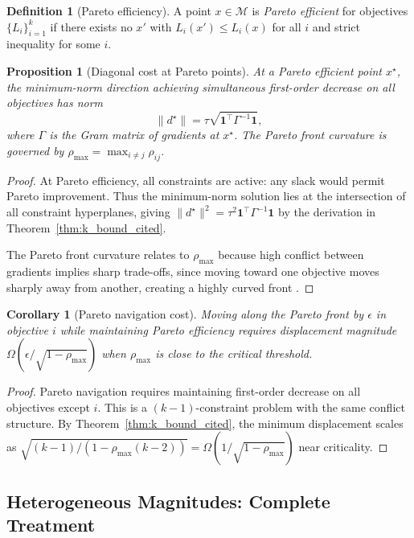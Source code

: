 \documentclass{article}
\theoremstyle{plain}
\newtheorem{proposition}[theorem]{Proposition}
\newtheorem{corollary}[theorem]{Corollary}
\theoremstyle{definition}
\newtheorem{definition}[theorem]{Definition}
\theoremstyle{remark}
\begin{document}
\begin{definition}[Pareto efficiency]
A point $x \in \mathcal{M}$ is \emph{Pareto efficient} for objectives $\{L_i\}_{i=1}^k$ if there exists no $x'$ with $L_i(x') \le L_i(x)$ for all $i$ and strict inequality for some $i$.
\end{definition}

\begin{proposition}[Diagonal cost at Pareto points]
At a Pareto efficient point $x^\star$, the minimum-norm direction achieving simultaneous first-order decrease on all objectives has norm
\[
\|d^\star\| = \tau \sqrt{\mathbf{1}^\top \Gamma^{-1} \mathbf{1}},
\]
where $\Gamma$ is the Gram matrix of gradients at $x^\star$. The Pareto front curvature is governed by $\rho_{\max} = \max_{i \neq j} \rho_{ij}$.
\end{proposition}

\begin{proof}
At Pareto efficiency, all constraints are active: any slack would permit Pareto improvement. Thus the minimum-norm solution lies at the intersection of all constraint hyperplanes, giving $\|d^\star\|^2 = \tau^2 \mathbf{1}^\top \Gamma^{-1} \mathbf{1}$ by the derivation in Theorem~\ref{thm:k_bound_cited}.

The Pareto front curvature relates to $\rho_{\max}$ because high conflict between gradients implies sharp trade-offs, since moving toward one objective moves sharply away from another, creating a highly curved front \citep{deb2002fast}.
\end{proof}

\begin{corollary}[Pareto navigation cost]
Moving along the Pareto front by $\epsilon$ in objective $i$ while maintaining Pareto efficiency requires displacement magnitude $\Omega(\epsilon / \sqrt{1-\rho_{\max}})$ when $\rho_{\max}$ is close to the critical threshold.
\end{corollary}

\begin{proof}
Pareto navigation requires maintaining first-order decrease on all objectives except $i$. This is a $(k-1)$-constraint problem with the same conflict structure. By Theorem~\ref{thm:k_bound_cited}, the minimum displacement scales as $\sqrt{(k-1)/(1-\rho_{\max}(k-2))} = \Omega(1/\sqrt{1-\rho_{\max}})$ near criticality.
\end{proof}

\subsection{Heterogeneous Magnitudes: Complete Treatment}\label{app:hetero}
\end{document}
